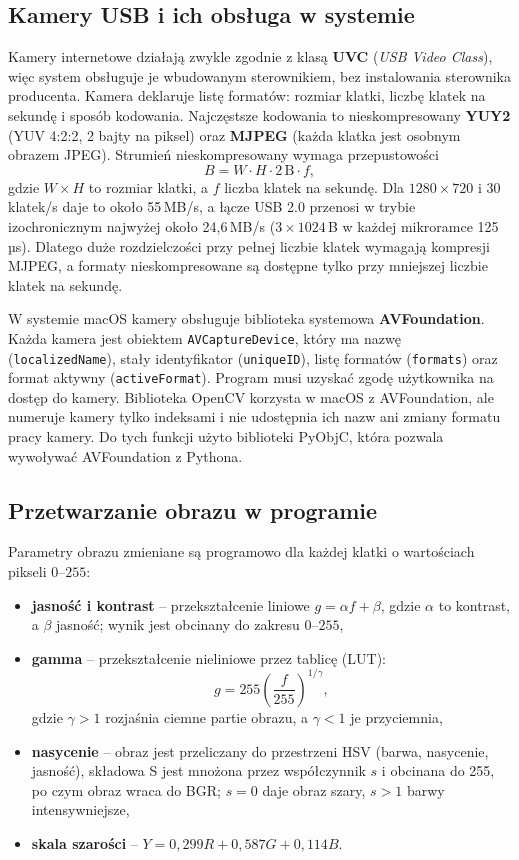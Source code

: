 \subsection{Kamery USB i ich obsługa w systemie}
Kamery internetowe działają zwykle zgodnie z klasą \textbf{UVC} (\emph{USB Video Class}), więc
system obsługuje je wbudowanym sterownikiem, bez instalowania sterownika producenta. Kamera
deklaruje listę formatów: rozmiar klatki, liczbę klatek na sekundę i sposób kodowania. Najczęstsze
kodowania to nieskompresowany \textbf{YUY2} (YUV 4:2:2, 2 bajty na piksel) oraz \textbf{MJPEG}
(każda klatka jest osobnym obrazem JPEG). Strumień nieskompresowany wymaga przepustowości
\begin{equation}
  B = W \cdot H \cdot 2\,\text{B} \cdot f,
\end{equation}
gdzie $W\times H$ to rozmiar klatki, a $f$ liczba klatek na sekundę. Dla $1280\times720$ i 30
klatek/s daje to około 55\,MB/s, a łącze USB 2.0 przenosi w trybie izochronicznym najwyżej około
24,6\,MB/s ($3 \times 1024$\,B w każdej mikroramce 125\,µs). Dlatego duże rozdzielczości przy
pełnej liczbie klatek wymagają kompresji MJPEG, a formaty nieskompresowane są dostępne tylko przy
mniejszej liczbie klatek na sekundę.

W systemie macOS kamery obsługuje biblioteka systemowa \textbf{AVFoundation}. Każda kamera jest
obiektem \texttt{AVCaptureDevice}, który ma nazwę (\texttt{localizedName}), stały identyfikator
(\texttt{uniqueID}), listę formatów (\texttt{formats}) oraz format aktywny (\texttt{activeFormat}).
Program musi uzyskać zgodę użytkownika na dostęp do kamery. Biblioteka OpenCV korzysta w macOS
z AVFoundation, ale numeruje kamery tylko indeksami i nie udostępnia ich nazw ani zmiany formatu
pracy kamery. Do tych funkcji użyto biblioteki PyObjC, która pozwala wywoływać AVFoundation
z Pythona.

\subsection{Przetwarzanie obrazu w programie}
Parametry obrazu zmieniane są programowo dla każdej klatki o wartościach pikseli $0$--$255$:
\begin{itemize}
  \item \textbf{jasność i kontrast} -- przekształcenie liniowe $g = \alpha f + \beta$, gdzie
    $\alpha$ to kontrast, a $\beta$ jasność; wynik jest obcinany do zakresu $0$--$255$,
  \item \textbf{gamma} -- przekształcenie nieliniowe przez tablicę (LUT):
    \begin{equation}
      g = 255 \left(\frac{f}{255}\right)^{1/\gamma},
    \end{equation}
    gdzie $\gamma > 1$ rozjaśnia ciemne partie obrazu, a $\gamma < 1$ je przyciemnia,
  \item \textbf{nasycenie} -- obraz jest przeliczany do przestrzeni HSV (barwa, nasycenie,
    jasność), składowa S jest mnożona przez współczynnik $s$ i obcinana do 255, po czym obraz
    wraca do BGR; $s = 0$ daje obraz szary, $s > 1$ barwy intensywniejsze,
  \item \textbf{skala szarości} -- $Y = 0{,}299R + 0{,}587G + 0{,}114B$.
\end{itemize}

